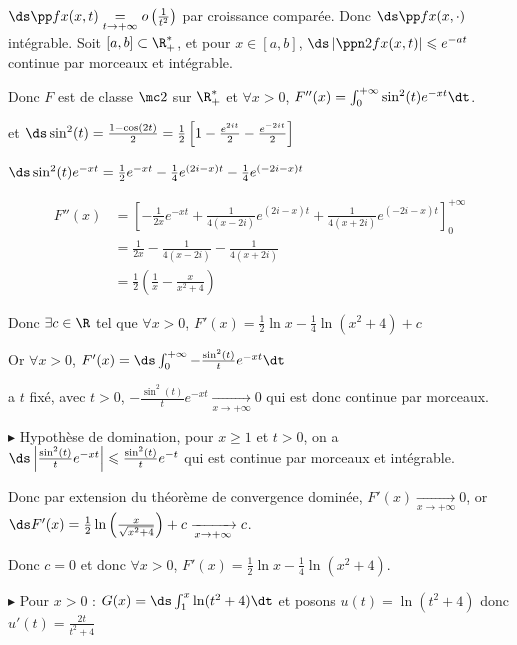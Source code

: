 \begin{exemple}
    $\ds \pp f x (x, t) \underset{t \to + \infty}{=} o\left( \frac 1 {t^2} \right)$ par croissance comparée.
    Donc $\ds \pp f x (x, \cdot)$ intégrable. 
    Soit $[a, b] \subset \R_+^*$, et pour $x \in [a, b]$, $\ds \left| \ppn 2 f x (x, t) \right| \leqslant e^{-at}$ continue par morceaux et intégrable.

    Donc $F$ est de classe $\mc 2$ sur $\R_+^*$ et $\forall x > 0$, $F''(x) = \int_0^{+ \infty} \sin^2(t) e^{-xt} \dt$.

    et $\ds \sin^2(t) = \frac{1 - \cos (2t)}{2} = \frac 1 2 \left[ 1 - \frac{e^{2it}}{2} - \frac{e^{-2it}}{2} \right]$

    $\ds \sin^2(t) e^{-xt} = \frac 1 2 e^{-xt} - \frac 1 4 e^{(2i - x)t} - \frac 1 4e^{(-2i - x)t}$

    \begin{align}
        F''(x) & = \left[ - \frac 1 {2x} e^{-xt} + \frac 1 {4(x - 2i)} e^{(2i - x)t} + \frac 1 {4(x + 2i)} e^{(-2i - x)t} \right]_0^{+ \infty} \\
        & = \frac{1}{2x} - \frac 1 {4(x - 2i)} - \frac 1 {4(x + 2i)} \\
        & = \frac{1}{2} \left( \frac{1}{x} - \frac{x}{x^2 + 4} \right) 
    \end{align}

    Donc $\exists c \in \R$ tel que $\forall x > 0$, $F'(x) = \frac 1 2 \ln x - \frac 1 4 \ln(x^2 + 4) + c$ 

    Or $\forall x > 0 $, $F'(x) = \ds \int_{0}^{+ \infty} - \frac{\sin^2(t)}{t} e^{-xt} \dt$

    a $t$ fixé, avec $t > 0$, $- \frac{\sin^2(t)}{t} e^{-xt} \xrightarrow[x \to + \infty]{} 0$ qui est donc continue par morceaux. 

    \avspace $\blacktriangleright$ Hypothèse de domination, pour $x \geqslant 1$ et $t > 0$, 
    on a $\ds \left| \frac{\sin^2(t)}{t} e^{-xt} \right| \leqslant \frac{\sin^2(t)}{t} e^{-t}$ qui est continue par morceaux et intégrable.

    Donc par extension du théorème de convergence dominée, $F'(x) \xrightarrow[x \to + \infty]{} 0$, 
    or $\ds F'(x) = \frac 1 2 \ln \left( \frac x {\sqrt{x^2 + 4}} \right) + c \xrightarrow[x \to + \infty]{} c$.

    Donc $c = 0$ et donc $\forall x > 0$, $F'(x) = \frac 1 2 \ln x - \frac 1 4 \ln(x^2 + 4)$. 

    \avspace $\blacktriangleright$ Pour $x > 0$ : $G(x) = \ds \int_{1}^{x} \ln(t^2 + 4) \dt $ et posons 
    $u(t) = \ln(t^2 + 4)$ donc $u'(t) = \frac{2t}{t^2 + 4} $


\end{exemple}
